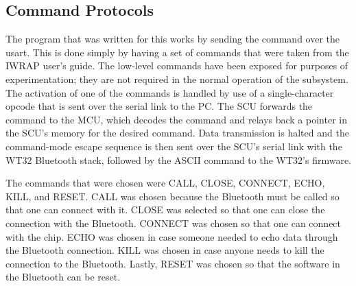 \subsection{Command Protocols}
The program that was written for this works by sending the command over the
 usart.  This is done simply by having a set of commands that were taken from 
the IWRAP user's guide. The low-level commands have been exposed for purposes
of experimentation; they are not required in the normal operation of the 
subsystem. The activation of one of the commands is handled by use of a
single-character opcode that is sent over the serial link to the PC. The SCU
forwards the command to the MCU, which decodes the command and relays back a
pointer in the SCU's memory for the desired command. Data transmission is 
halted and the command-mode escape sequence is then sent over the SCU's serial
link with the WT32 Bluetooth stack, followed by the ASCII command to the WT32's firmware. 
 
  The commands that were chosen were CALL, CLOSE, CONNECT, ECHO, KILL, and
 RESET.  CALL was chosen because the Bluetooth must be called so that one can
 connect with it.  CLOSE was selected so that one can close the connection 
with the Bluetooth.  CONNECT was chosen so that one can connect with the chip.
  ECHO was chosen in case someone needed to echo data through the Bluetooth
 connection.  KILL was chosen in case anyone needs to kill the connection to
 the Bluetooth.  Lastly, RESET was chosen so that the software in the Bluetooth
 can be reset. 
